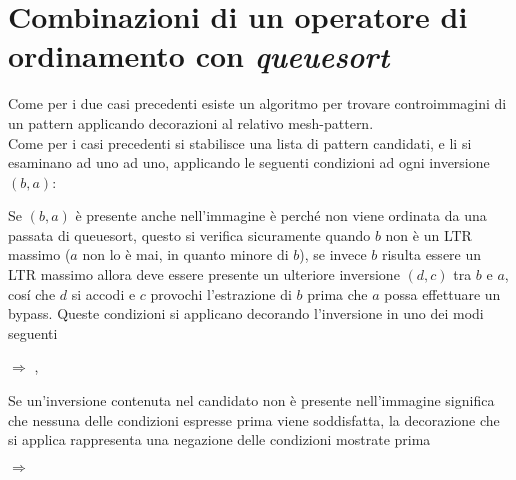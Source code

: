 \section{Combinazioni di un operatore di ordinamento con \textit{queuesort}}
Come per i due casi precedenti esiste un algoritmo per trovare controimmagini di un pattern applicando decorazioni al relativo mesh-pattern.\\
Come per i casi precedenti si stabilisce una lista di pattern candidati, e li si esaminano ad uno ad uno, applicando le seguenti condizioni ad ogni inversione $(b,a)$:
\begin{description} 
	\item Se $(b,a)$ \`e presente anche nell'immagine \`e perch\'e non viene ordinata da una passata di queuesort, questo si verifica sicuramente quando $b$ non \`e un LTR massimo ($a$ non lo \`e mai, in quanto minore di $b$), se invece $b$ risulta essere un LTR massimo allora deve essere presente un ulteriore inversione $(d,c)$ tra $b$ e $a$, cos\'i che $d$ si accodi e $c$ provochi l'estrazione di $b$ prima che $a$ possa effettuare un bypass. Queste condizioni si applicano decorando l'inversione in uno dei modi seguenti
	\begin{center}
		 $\Rightarrow$
		,
	\end{center}
	\item Se un'inversione contenuta nel candidato non \`e presente nell'immagine significa che nessuna delle condizioni espresse prima viene soddisfatta, la decorazione che si applica rappresenta una negazione delle condizioni mostrate prima
	\begin{center}
		 $\Rightarrow$
	\end{center}
\end{description}
